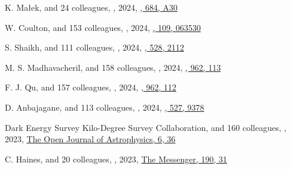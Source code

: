 \begin{etaremune}
\item
K. Małek, and 24 colleagues,
,
2024, \href{https://ui.adsabs.harvard.edu/abs/2024A&A...684A..30M}{\aap, 684, A30}

\item
W. Coulton, and 153 colleagues,
,
2024, \href{https://ui.adsabs.harvard.edu/abs/2024PhRvD.109f3530C}{\prd, 109, 063530}

\item
S. Shaikh, and 111 colleagues,
,
2024, \href{https://ui.adsabs.harvard.edu/abs/2024MNRAS.528.2112S}{\mnras, 528, 2112}

\item
M. S. Madhavacheril, and 158 colleagues,
,
2024, \href{https://ui.adsabs.harvard.edu/abs/2024ApJ...962..113M}{\apj, 962, 113}

\item
F. J. Qu, and 157 colleagues,
,
2024, \href{https://ui.adsabs.harvard.edu/abs/2024ApJ...962..112Q}{\apj, 962, 112}

\item
D. Anbajagane, and 113 colleagues,
,
2024, \href{https://ui.adsabs.harvard.edu/abs/2024MNRAS.527.9378A}{\mnras, 527, 9378}

\item
Dark Energy Survey Kilo-Degree Survey Collaboration, and 160 colleagues,
,
2023, \href{https://ui.adsabs.harvard.edu/abs/2023OJAp....6E..36D}{The Open Journal of Astrophysics, 6, 36}

\item
C. Haines, and 20 colleagues,
,
2023, \href{https://ui.adsabs.harvard.edu/abs/2023Msngr.190...31H}{The Messenger, 190, 31}
\arxiv


\end{etaremune}
